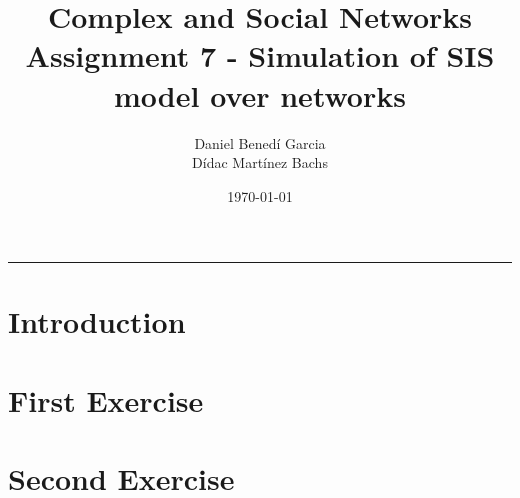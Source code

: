 \documentclass{article}
\title{Complex and Social Networks \\ Assignment 7 - Simulation of SIS model over networks}
\author{Daniel Benedí Garcia \\ Dídac Martínez Bachs}
\date{\monthyeardate\today}
\begin{document}
\begin{multicols}{2}
\tableofcontents
\end{multicols}
\hrule
\section{Introduction}


\section{First Exercise}


\section{Second Exercise}


\printbibliography

\pagebreak
\appendix

\end{document}
